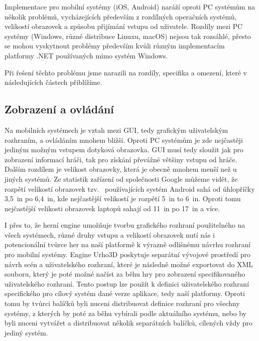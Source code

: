 Implementace pro mobilní systémy (iOS, Android) naráží oproti PC systémům na několik problémů, vycházejících především z rozdílných operačních systémů, velikostí obrazovek a způsobu přijímání vstupu od uživatele. Rozdíly mezi PC systémy (Windows, různé distribuce Linuxu, macOS) nejsou tak rozsáhlé, přesto se mohou vyskytnout problémy především kvůli různým implementacím platformy .NET používaných mimo systém Windows.

Při řešení těchto problému jsme narazili na rozdíly, specifika a omezení, které v následujících částech přiblížíme.

\subsection{Zobrazení a ovládání}
Na mobilních systémech je vztah mezi GUI, tedy grafickým uživatelským rozhraním, a ovládáním mnohem bližší. Oproti PC systémům je zde nejčastěji jediným možným vstupem dotyková obrazovka. GUI musí tedy sloužit jak pro zobrazení informací hráči, tak pro získání převážné většiny vstupu od hráče. Dalším rozdílem je velikost obrazovky, která je obecně mnohem menší než u jiných systémů. Ze statistik zařízení od společnosti Google \citep{site:materialdesign} můžeme vidět, že rozpětí velikostí obrazovek tzv.~ používajících systém Android sahá od úhlopříčky 3,5~in po 6,4~in, kde nejčastější velikostí je rozpětí 5~in to 6~in. Oproti tomu nejčastější velikosti obrazovek laptopů sahají od 11~in po 17~in a více. 

I přes to, že herní engine umožňuje tvorbu grafického rozhraní použitelného na všech systémech, různé druhy vstupu a velikostí obrazovek nutí nás i potencionální tvůrce her na naší platformě k výrazně odlišnému návrhu rozhraní pro mobilní systémy. Engine Urho3D poskytuje separátní vývojové prostředí pro návrh scén a uživatelského rozhraní, které je následně možné exportovat do XML souboru, který je poté možné načíst za běhu hry pro zobrazení specifikovaného uživatelského rozhraní. Tento postup lze použít k definici uživatelského rozhraní specifického pro cílový systém dané verze aplikace, tedy naší platformy. Oproti tomu by tvůrci balíčků byli nuceni distribuovat definice rozhraní pro všechny systémy, z kterých by poté za běhu vybírali podle aktuálního systému, nebo by byli nuceni vytvářet a distribuovat několik separátních balíčků, cílených vždy pro jediný systém. 

